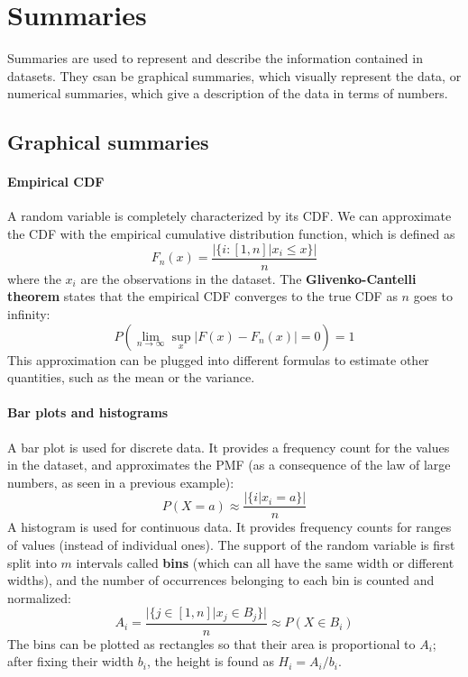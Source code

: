 \section*{Summaries}

Summaries are used to represent and describe the information contained in datasets. They csan be graphical summaries, which visually represent the data, or numerical summaries, which give a description of the data in terms of numbers.

\subsection*{Graphical summaries}
\paragraph{Empirical CDF} A random variable is completely characterized by its CDF. We can approximate the CDF with the empirical cumulative distribution function, which is defined as
\begin{equation*}
    F_n(x) = \frac{|\{ i : [1,n] | x_i \leq x \}|}{n}
\end{equation*}
where the $x_i$ are the observations in the dataset. The \textbf{Glivenko-Cantelli theorem} states that the empirical CDF converges to the true CDF as $n$ goes to infinity:
\begin{equation*}
    P(\lim_{n \to \infty} \sup_x |F(x) - F_n(x)| = 0) = 1
\end{equation*}
This approximation can be plugged into different formulas to estimate other quantities, such as the mean or the variance.

\paragraph{Bar plots and histograms}
A bar plot is used for discrete data. It provides a frequency count for the values in the dataset, and approximates the PMF (as a consequence of the law of large numbers, as seen in a previous example):
\begin{equation*}
    P(X = a) \approx \frac{|\{ i | x_i = a \}|}{n}
\end{equation*}
A histogram is used for continuous data. It provides frequency counts for ranges of values (instead of individual ones). The support of the random variable is first split into $m$ intervals called \textbf{bins} (which can all have the same width or different widths), and the number of occurrences belonging to each bin is counted and normalized:
\begin{equation*}
    A_i = \frac{|\{ j \in [1,n] |x_j \in B_j\}|}{n} \approx P(X \in B_i)
\end{equation*}
The bins can be plotted as rectangles so that their area is proportional to $A_i$; after fixing their width $b_i$, the height is found as $H_i = A_i / b_i$.

